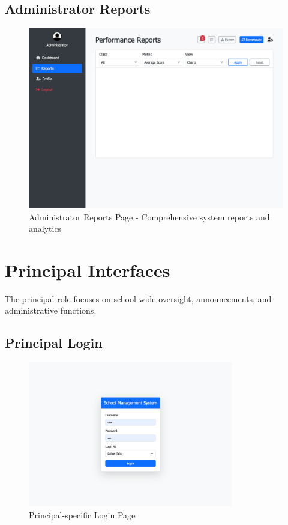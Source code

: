 \documentclass[12pt,a4paper]{article}
\begin{document}
\subsection{Administrator Reports}
\begin{figure}[H]
    \centering
    \includegraphics[width=\textwidth]{admin/admin-reports-page.png}
    \caption{Administrator Reports Page - Comprehensive system reports and analytics}
    \label{fig:admin-reports}
\end{figure}

\section{Principal Interfaces}

The principal role focuses on school-wide oversight, announcements, and administrative functions.

\subsection{Principal Login}
\begin{figure}[H]
    \centering
    \includegraphics[width=0.8\textwidth]{principal/login-page.png}
    \caption{Principal-specific Login Page}
    \label{fig:principal-login}
\end{figure}
\end{document}
